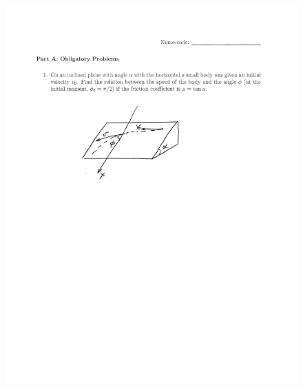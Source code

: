 \documentclass[10pt,a4paper]{article}
\begin{document}
 \newpage
\begin{figure}[H]
 \centering
 \includegraphics[width=16cm]{pdf/1-1T50.png}
\end{figure}
 \newpage
\end{document}
